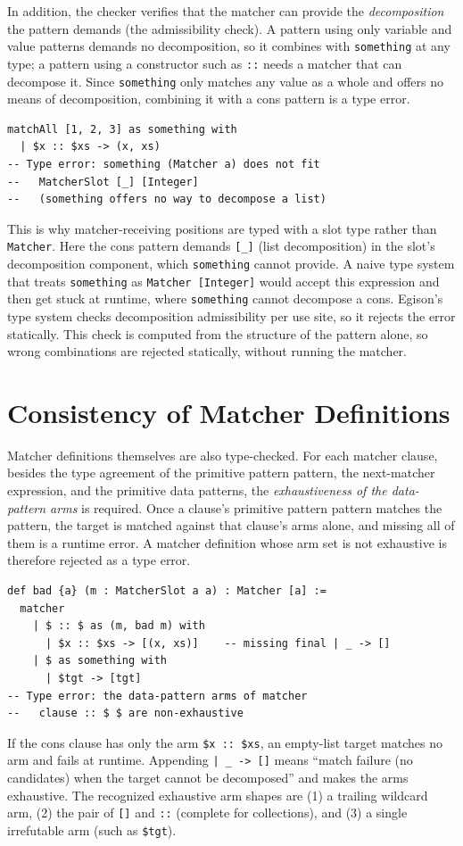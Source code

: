In addition, the checker verifies that the matcher can provide the \emph{decomposition} the pattern demands (the admissibility check).
A pattern using only variable and value patterns demands no decomposition, so it combines with \lstinline{something} at any type; a pattern using a constructor such as \lstinline{::} needs a matcher that can decompose it.
Since \lstinline{something} only matches any value as a whole and offers no means of decomposition, combining it with a cons pattern is a type error.
\begin{lstlisting}[language=egison,numbers=none]
matchAll [1, 2, 3] as something with
  | $x :: $xs -> (x, xs)
-- Type error: something (Matcher a) does not fit
--   MatcherSlot [_] [Integer]
--   (something offers no way to decompose a list)
\end{lstlisting}
This is why matcher-receiving positions are typed with a slot type rather than \lstinline{Matcher}.
Here the cons pattern demands \lstinline{[_]} (list decomposition) in the slot's decomposition component, which \lstinline{something} cannot provide.
A naive type system that treats \lstinline{something} as \lstinline{Matcher [Integer]} would accept this expression and then get stuck at runtime, where \lstinline{something} cannot decompose a cons.
Egison's type system checks decomposition admissibility per use site, so it rejects the error statically.
This check is computed from the structure of the pattern alone, so wrong combinations are rejected statically, without running the matcher.

\section{Consistency of Matcher Definitions}\label{matcher-consistency}

Matcher definitions themselves are also type-checked.
For each matcher clause, besides the type agreement of the primitive pattern pattern, the next-matcher expression, and the primitive data patterns, the \emph{exhaustiveness of the data-pattern arms} is required.
Once a clause's primitive pattern pattern matches the pattern, the target is matched against that clause's arms alone, and missing all of them is a runtime error.
A matcher definition whose arm set is not exhaustive is therefore rejected as a type error.
\begin{lstlisting}[language=egison]
def bad {a} (m : MatcherSlot a a) : Matcher [a] :=
  matcher
    | $ :: $ as (m, bad m) with
      | $x :: $xs -> [(x, xs)]    -- missing final | _ -> []
    | $ as something with
      | $tgt -> [tgt]
-- Type error: the data-pattern arms of matcher
--   clause :: $ $ are non-exhaustive
\end{lstlisting}
If the cons clause has only the arm \lstinline{$x :: $xs}, an empty-list target matches no arm and fails at runtime.
Appending \lstinline{| _ -> []} means ``match failure (no candidates) when the target cannot be decomposed'' and makes the arms exhaustive.
The recognized exhaustive arm shapes are (1) a trailing wildcard arm, (2) the pair of \lstinline{[]} and \lstinline{::} (complete for collections), and (3) a single irrefutable arm (such as \lstinline{$tgt}).

